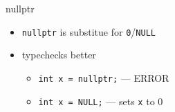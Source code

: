 \begin{frame}{nullptr}
\begin{itemize}
\item \texttt{nullptr} is substitue for \texttt{0}/\texttt{NULL}
\item typechecks better 
\begin{itemize}
\item \texttt{int x = nullptr;} --- ERROR
\item \texttt{int x = NULL;} --- sets \texttt{x} to 0
\end{itemize}
\end{itemize}
\end{frame}
